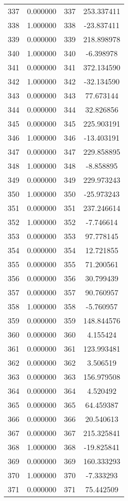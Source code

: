 \documentclass[12pt]{article}
\begin{document}
\begin{longtable}{@{}cccc@{}}
337 & 0.000000 & 337 & 253.337411 \\
338 & 1.000000 & 338 & -23.837411 \\
339 & 0.000000 & 339 & 218.898978 \\
340 & 1.000000 & 340 & -6.398978 \\
341 & 0.000000 & 341 & 372.134590 \\
342 & 1.000000 & 342 & -32.134590 \\
343 & 0.000000 & 343 & 77.673144 \\
344 & 0.000000 & 344 & 32.826856 \\
345 & 0.000000 & 345 & 225.903191 \\
346 & 1.000000 & 346 & -13.403191 \\
347 & 0.000000 & 347 & 229.858895 \\
348 & 1.000000 & 348 & -8.858895 \\
349 & 0.000000 & 349 & 229.973243 \\
350 & 1.000000 & 350 & -25.973243 \\
351 & 0.000000 & 351 & 237.246614 \\
352 & 1.000000 & 352 & -7.746614 \\
353 & 0.000000 & 353 & 97.778145 \\
354 & 0.000000 & 354 & 12.721855 \\
355 & 0.000000 & 355 & 71.200561 \\
356 & 0.000000 & 356 & 30.799439 \\
357 & 0.000000 & 357 & 90.760957 \\
358 & 1.000000 & 358 & -5.760957 \\
359 & 0.000000 & 359 & 148.844576 \\
360 & 0.000000 & 360 & 4.155424 \\
361 & 0.000000 & 361 & 123.993481 \\
362 & 0.000000 & 362 & 3.506519 \\
363 & 0.000000 & 363 & 156.979508 \\
364 & 0.000000 & 364 & 4.520492 \\
365 & 0.000000 & 365 & 64.459387 \\
366 & 0.000000 & 366 & 20.540613 \\
367 & 0.000000 & 367 & 215.325841 \\
368 & 1.000000 & 368 & -19.825841 \\
369 & 0.000000 & 369 & 160.333293 \\
370 & 1.000000 & 370 & -7.333293 \\
371 & 0.000000 & 371 & 75.442509 \\

\end{longtable}
\end{document}
